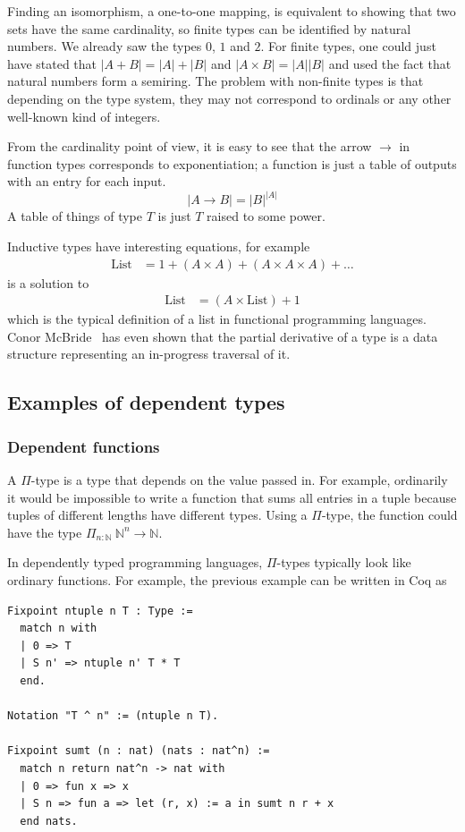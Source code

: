 \documentclass[english, 12pt, a4paper, sci, a-1b, online]{aaltothesis}
\begin{document}
Finding an isomorphism, a one-to-one mapping, is equivalent to showing that two sets have the same cardinality, so finite types can be identified by natural numbers. We already saw the types $0$, $1$ and $2$. For finite types, one could just have stated that $|A + B| = |A| + |B|$ and $|A \times B| = |A||B|$ and used the fact that natural numbers form a semiring. The problem with non-finite types is that depending on the type system, they may not correspond to ordinals or any other well-known kind of integers.

From the cardinality point of view, it is easy to see that the arrow $\to$ in function types corresponds to exponentiation; a function is just a table of outputs with an entry for each input.
\begin{equation*}
  |A \to B| = |B|^{|A|}
\end{equation*}
A table of things of type $T$ is just $T$ raised to some power.

Inductive types have interesting equations, for example
\begin{align*}
  \text{List} &= 1 + (A \times A) + (A \times A \times A) + \ldots
\end{align*}
is a solution to
\begin{align*}
  \text{List} &= (A \times \text{List}) + 1
\end{align*}
which is the typical definition of a list in functional programming languages. Conor McBride~\cite{typeDerivative} has even shown that the partial derivative of a type is a data structure representing an in-progress traversal of it.

\subsection{Examples of dependent types}
\subsubsection{Dependent functions}

A $\Pi$-type is a type that depends on the value passed in. For example, ordinarily it would be impossible to write a function that sums all entries in a tuple because tuples of different lengths have different types. Using a $\Pi$-type, the function could have the type $\Pi_{n : \mathbb N}~\mathbb N^n \to \mathbb N$.

In dependently typed programming languages, $\Pi$-types typically look like ordinary functions. For example, the previous example can be written in Coq as
\begin{verbatim}
Fixpoint ntuple n T : Type :=
  match n with
  | 0 => T
  | S n' => ntuple n' T * T
  end.

Notation "T ^ n" := (ntuple n T).

Fixpoint sumt (n : nat) (nats : nat^n) :=
  match n return nat^n -> nat with
  | 0 => fun x => x
  | S n => fun a => let (r, x) := a in sumt n r + x
  end nats.
\end{verbatim}
\end{document}
